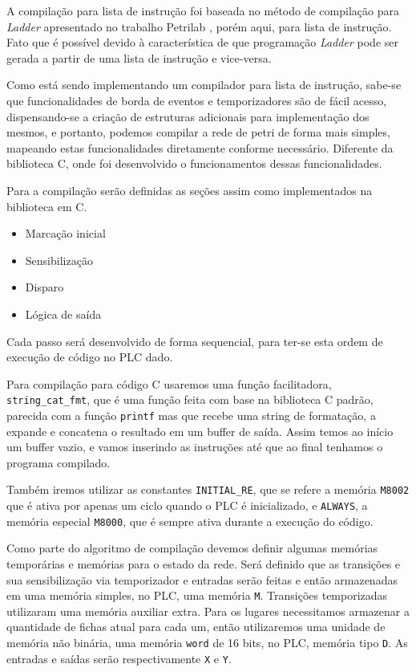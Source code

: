 A compilação para lista de instrução foi baseada no método de compilação para \textit{Ladder} apresentado no trabalho Petrilab \cite{de2015petrilab}, porém aqui, para lista de instrução. Fato que é possível devido à característica de que programação \textit{Ladder} pode ser gerada a partir de uma lista de instrução e vice-versa.   

Como está sendo implementando um compilador para lista de instrução, sabe-se que funcionalidades de borda de eventos e temporizadores são de fácil acesso, dispensando-se a criação de estruturas adicionais para implementação dos mesmos, e portanto, podemos compilar a rede de petri de forma mais simples, mapeando estas funcionalidades diretamente conforme necessário. Diferente da biblioteca C, onde foi desenvolvido o funcionamentos dessas funcionalidades.

Para a compilação serão definidas as seções assim como implementados na biblioteca em C.

\begin{itemize}
	\item Marcação inicial
	\item Sensibilização
	\item Disparo
	\item Lógica de saída
\end{itemize}

Cada passo será desenvolvido de forma sequencial, para ter-se esta ordem de execução de código no PLC dado.

Para compilação para código C usaremos uma função facilitadora, \lstinline{string_cat_fmt}, que é uma função feita com base na biblioteca C padrão, parecida com a função \lstinline{printf} mas que recebe uma string de formatação, a expande e concatena o resultado em um buffer de saída. Assim temos ao início um buffer vazio, e vamos inserindo as instruções até que ao final tenhamos o programa compilado. 

Também iremos utilizar as constantes \lstinline{INITIAL_RE}, que se refere a memória \lstinline{M8002} que é ativa por apenas um ciclo quando o PLC é inicializado, e \lstinline{ALWAYS}, a memória especial \lstinline{M8000}, que é sempre ativa durante a execução do código.

Como parte do algoritmo de compilação devemos definir algumas memórias temporárias e memórias para o estado da rede. Será definido que as transições e sua sensibilização via temporizador e entradas serão feitas e então armazenadas em uma memória simples, no PLC, uma memória \lstinline{M}. Transições temporizadas utilizaram uma memória auxiliar extra. Para os lugares necessitamos armazenar a quantidade de fichas atual para cada um, então utilizaremos uma unidade de memória não binária, uma memória \lstinline{word} de 16 bits, no PLC, memória tipo \lstinline{D}. As entradas e saídas serão respectivamente \lstinline{X} e \lstinline{Y}.

